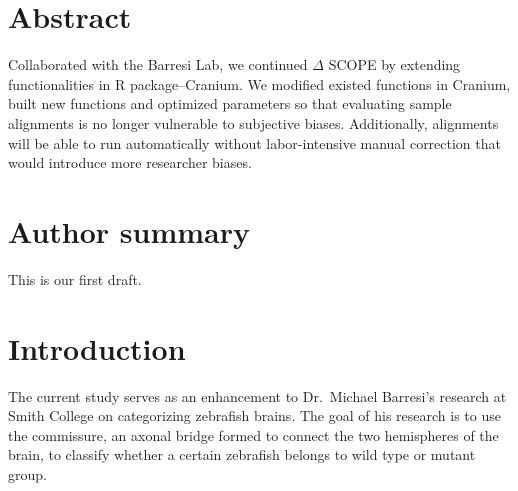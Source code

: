 \documentclass[10pt,letterpaper]{article}
\newcommand{\getIndex}[2]{
  \ForEach{,}{\IfEq{#1}{\thislevelitem}{\number\thislevelcount\ExitForEach}{}}{#2}
}
\newcommand{\getAff}[1]{
  \getIndex{#1}{}
}
\begin{document}
\vspace*{0.2in}

\section*{Abstract}
Collaborated with the Barresi Lab, we continued \(\Delta\) SCOPE by
extending functionalities in R package--Cranium. We modified existed
functions in Cranium, built new functions and optimized parameters so
that evaluating sample alignments is no longer vulnerable to subjective
biases. Additionally, alignments will be able to run automatically
without labor-intensive manual correction that would introduce more
researcher biases.

\section*{Author summary}
This is our first draft.

\linenumbers

\section{Introduction}\label{introduction}

The current study serves as an enhancement to Dr.~Michael Barresi's
research at Smith College on categorizing zebrafish brains. The goal of
his research is to use the commissure, an axonal bridge formed to
connect the two hemispheres of the brain, to classify whether a certain
zebrafish belongs to wild type or mutant group.
\end{document}
